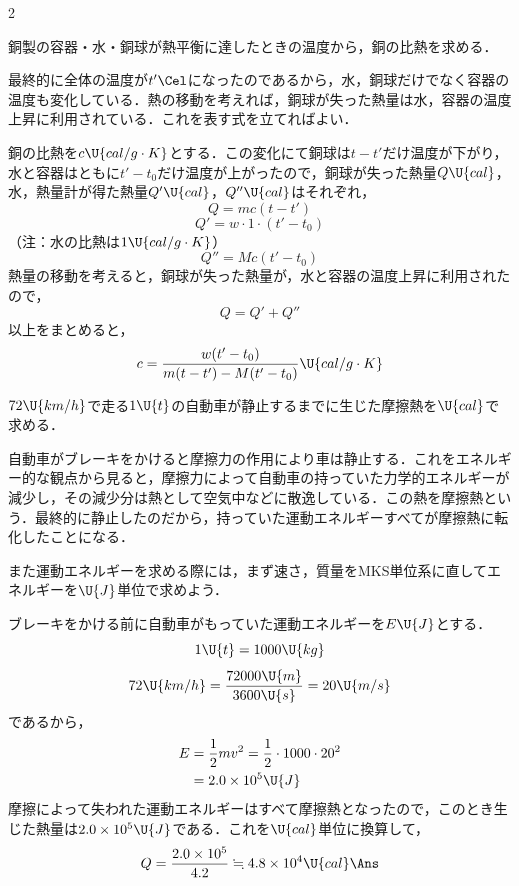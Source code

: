 \begin{multicols}{2}
\begin{kaitou}
\end{kaitou}
\begin{saikei}
銅製の容器・水・銅球が熱平衡に達したときの温度から，銅の比熱を求める．
\end{saikei}
\begin{sisin}
最終的に全体の温度が$t'\Cel$になったのであるから，水，銅球だけでなく容器の温度も変化している．熱の移動を考えれば，銅球が失った熱量は水，容器の温度上昇に利用されている．これを表す式を立てればよい．
\end{sisin}
\begin{kaitou}
\hspace{1zw}銅の比熱を$c\U{cal/g\cdot K}$とする．この変化にて銅球は$t-t'$だけ温度が下がり，水と容器はともに$t'-t_0$だけ温度が上がったので，銅球が失った熱量$Q\U{cal}$，水，熱量計が得た熱量$Q'\U{cal}$，$Q''\U{cal}$はそれぞれ，
\[Q=mc(t-t')\]
\[Q'=w\cdot 1\cdot(t'-t_0)\]
\hspace*{2zw}（注：水の比熱は$1\U{cal/g\cdot K}$）
\[Q''=Mc(t'-t_0)\]
\hspace{1zw}熱量の移動を考えると，銅球が失った熱量が，水と容器の温度上昇に利用されたので，
\[Q=Q'+Q''\]
以上をまとめると，
\[c=\frac{w(t'-t_0)}{m(t-t')-M(t'-t_0)}\U{cal/g\cdot K}\]
\hspace*{\fill}\Ans

\end{kaitou}
\begin{saikei}
$72\U{km/h}$で走る$1\U{t}$の自動車が静止するまでに生じた摩擦熱を$\U{cal}$で求める．
\end{saikei}
\begin{sisin}
自動車がブレーキをかけると摩擦力の作用により車は静止する．これをエネルギー的な観点から見ると，摩擦力によって自動車の持っていた力学的エネルギーが減少し，その減少分は熱として空気中などに散逸している．この熱を{\gtfamily 摩擦熱}という．最終的に静止したのだから，持っていた運動エネルギーすべてが摩擦熱に転化したことになる．

また運動エネルギーを求める際には，まず速さ，質量をMKS単位系に直してエネルギーを$\U{J}$単位で求めよう．
\end{sisin}
\begin{kaitou}
\hspace{1zw}ブレーキをかける前に自動車がもっていた運動エネルギーを$E\U{J}$とする．
\[1\U{t}=1000\U{kg}\]
\[72\U{km/h}=\frac{72000\U{m}}{3600\U{s}}=20\U{m/s}\]
であるから，
\[\begin{aligned}
  E&=\frac{1}{2}mv^2=\frac{1}{2}\cdot 1000\cdot 20^2\\
   &=2.0\times 10^5\U{J}
\end{aligned}\]
\hspace{1zw}摩擦によって失われた運動エネルギーはすべて摩擦熱となったので，このとき生じた熱量は$2.0\times 10^5\U{J}$である．これを$\U{cal}$単位に換算して，
\[Q=\frac{2.0\times 10^5}{4.2}\fallingdotseq 4.8\times 10^4\U{cal}\Ans\]


\end{kaitou}
\end{multicols}
